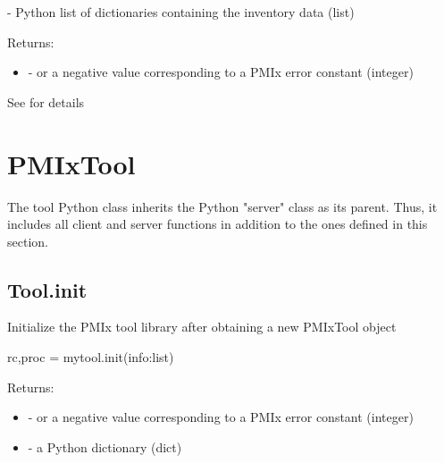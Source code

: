 \begin{arglist}
 - Python list of  dictionaries containing the inventory data (list)
\end{arglist}

Returns:

\begin{itemize}
    \item {} -  or a negative value corresponding to a PMIx error constant (integer)
\end{itemize}


See  for details



\section{PMIxTool}
\label{app:python:tool}

The tool Python class inherits the Python "server" class as its parent. Thus, it includes all client and server functions in addition to the ones defined in this section.

\subsection{Tool.init}

\summary Initialize the \ac{PMIx} tool library after obtaining a new PMIxTool object

\format

\pyspecificstart
\begin{codepar}
rc,proc = mytool.init(info:list)
\end{codepar}
\pyspecificend


\begin{arglist}
\end{arglist}

Returns:

\begin{itemize}
    \item {} -  or a negative value corresponding to a PMIx error constant (integer)
    \item {} - a Python  dictionary (dict)
\end{itemize}


